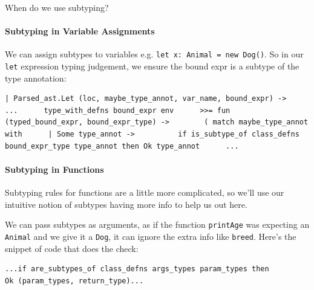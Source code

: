 When do we use subtyping?

\hypertarget{subtyping-in-variable-assignments}{%
\paragraph{\texorpdfstring{\protect\hyperlink{subtyping-in-variable-assignments}{}Subtyping
in Variable
Assignments}{Subtyping in Variable Assignments}}\label{subtyping-in-variable-assignments}}

We can assign subtypes to variables e.g.
\texttt{let\ x:\ Animal\ =\ new\ Dog()}. So in our \texttt{let}
expression typing judgement, we ensure the bound expr is a subtype of
the type annotation:

%


\begin{lstlisting}[caption={type\_inheritance.ml},language=caml]
| Parsed_ast.Let (loc, maybe_type_annot, var_name, bound_expr) ->      ...      type_with_defns bound_expr env      >>= fun (typed_bound_expr, bound_expr_type) ->        ( match maybe_type_annot with      | Some type_annot ->          if is_subtype_of class_defns bound_expr_type type_annot then Ok type_annot      ...
\end{lstlisting}

\hypertarget{subtyping-in-functions}{%
\paragraph{\texorpdfstring{\protect\hyperlink{subtyping-in-functions}{}Subtyping
in Functions}{Subtyping in Functions}}\label{subtyping-in-functions}}

Subtyping rules for functions are a little more complicated, so we'll
use our intuitive notion of subtypes having more info to help us out
here.

We can pass subtypes as arguments, as if the function \texttt{printAge}
was expecting an \texttt{Animal} and we give it a \texttt{Dog}, it can
ignore the extra info like \texttt{breed}. Here's the snippet of code
that does the check:

%


\begin{lstlisting}[caption={type\_overloading.ml},language=caml]
...if are_subtypes_of class_defns args_types param_types then        Ok (param_types, return_type)...
\end{lstlisting}


